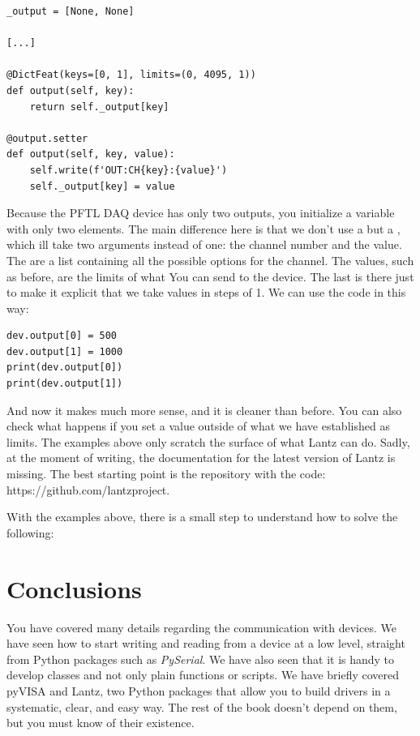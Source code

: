 \begin{verbatim}
_output = [None, None]

[...]

@DictFeat(keys=[0, 1], limits=(0, 4095, 1))
def output(self, key):
    return self._output[key]

@output.setter
def output(self, key, value):
    self.write(f'OUT:CH{key}:{value}')
    self._output[key] = value
\end{verbatim}

Because the {PFTL DAQ} device has only two outputs, you initialize a variable  with only two elements. The main difference here is that we don't use a  but a , which ill take two arguments instead of one: the channel number and the value. The  are a list containing all the possible options for the channel. The values, such as before, are the limits of what You can send to the device. The last  is there just to make it explicit that we take values in steps of 1. We can use the code in this way:

\begin{verbatim}
dev.output[0] = 500
dev.output[1] = 1000
print(dev.output[0])
print(dev.output[1])
\end{verbatim}

And now it makes much more sense, and it is cleaner than before. You can also check what happens if you set a value outside of what we have established as limits. The examples above only scratch the surface of what Lantz can do. Sadly, at the moment of writing, the documentation for the latest version of Lantz is missing. The best starting point is the repository with the code: https://github.com/lantzproject.

With the examples above, there is a small step to understand how to solve the following:


\section{Conclusions}\label{sec:conclusions2}
You have covered many details regarding the communication with devices. We have seen how to start writing and reading from a device at a low level, straight from Python packages such as \emph{PySerial}. We have also seen that it is handy to develop classes and not only plain functions or scripts. We have briefly covered pyVISA and Lantz, two Python packages that allow you to build drivers in a systematic, clear, and easy way. The rest of the book doesn't depend on them, but you must know of their existence.

